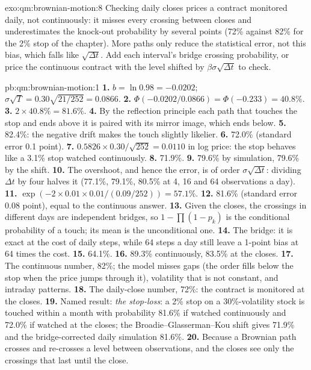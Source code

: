 \begin{solution}{exo:qm:brownian-motion:8}
Checking daily closes prices a contract monitored daily, not continuously: it misses every
crossing between closes and underestimates the knock-out probability by several points (72\%
against 82\% for the 2\% stop of the chapter). More paths only reduce the statistical error,
not this bias, which falls like $\sqrt{\Delta t}$. Add each interval's bridge crossing
probability, or price the continuous contract with the level shifted by $\beta\sigma\sqrt{\Delta t}$
to check.
\end{solution}

\begin{solution}{pb:qm:brownian-motion:1}
\textbf{1.} $b = \ln 0.98 = -0.0202$; $\sigma\sqrt T = 0.30\sqrt{21/252} = 0.0866$.
\textbf{2.} $\Phi(-0.0202/0.0866) = \Phi(-0.233) = 40.8\%$.
\textbf{3.} $2 \times 40.8\% = 81.6\%$.
\textbf{4.} By the reflection principle each path that touches the stop and ends above it is
paired with its mirror image, which ends below.
\textbf{5.} 82.4\%: the negative drift makes the touch slightly likelier.
\textbf{6.} 72.0\% (standard error 0.1 point).
\textbf{7.} $0.5826 \times 0.30/\sqrt{252} = 0.0110$ in log price: the stop behaves like a 3.1\%
stop watched continuously.
\textbf{8.} 71.9\%.
\textbf{9.} 79.6\% by simulation, 79.6\% by the shift.
\textbf{10.} The overshoot, and hence the error, is of order $\sigma\sqrt{\Delta t}$: dividing
$\Delta t$ by four halves it (77.1\%, 79.1\%, 80.5\% at 4, 16 and 64 observations a day).
\textbf{11.} $\exp(-2 \times 0.01 \times 0.01/(0.09/252)) = 57.1\%$.
\textbf{12.} 81.6\% (standard error 0.08 point), equal to the continuous answer.
\textbf{13.} Given the closes, the crossings in different days are independent bridges, so $1
- \prod(1 - p_k)$ is the conditional probability of a touch; its mean is the unconditional one.
\textbf{14.} The bridge: it is exact at the cost of daily steps, while 64 steps a day still
leave a 1-point bias at 64 times the cost.
\textbf{15.} 64.1\%.
\textbf{16.} 89.3\% continuously, 83.5\% at the closes.
\textbf{17.} The continuous number, 82\%; the model misses gaps (the order fills below the stop
when the price jumps through it), volatility that is not constant, and intraday patterns.
\textbf{18.} The daily-close number, 72\%: the contract is monitored at the closes.
\textbf{19.} Named result: \emph{the stop-loss}: a 2\% stop on a 30\%-volatility stock is touched
within a month with probability 81.6\% if watched continuously and 72.0\% if watched at the
closes; the Broadie--Glasserman--Kou shift gives 71.9\% and the bridge-corrected daily
simulation 81.6\%.
\textbf{20.} Because a Brownian path crosses and re-crosses a level between observations, and
the closes see only the crossings that last until the close.
\end{solution}

